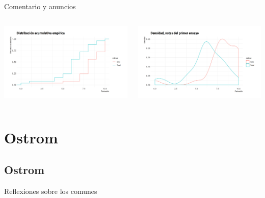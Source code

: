 \documentclass[11pt, aspectratio=169, compress]{beamer}
\begin{document}
\begin{frame}{Comentario y anuncios}
\begin{columns}
	\begin{column}{0.5\textwidth}
		\begin{center}
		\includegraphics[width=1.1\textwidth]{fig1}
		\end{center}
	\end{column}
	\begin{column}{0.5\textwidth}  %
		\begin{center}
			\includegraphics[width=1.1\textwidth]{fig2}
		\end{center}
	\end{column}
\end{columns}
\end{frame}
\section{Ostrom}
\subsection{Ostrom}
\begin{frame}{Reflexiones sobre los comunes}
	
\end{frame}
\end{document}
